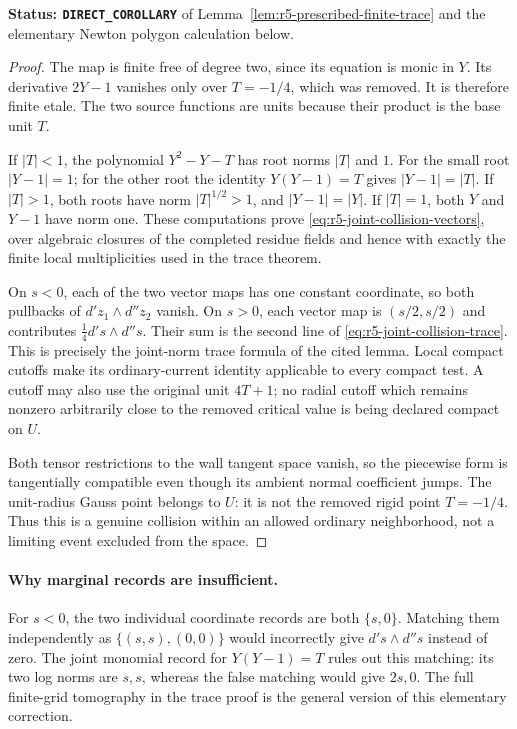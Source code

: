 \documentclass[11pt,a4paper]{article}
\numberwithin{equation}{section}
\theoremstyle{definition}
\theoremstyle{remark}
\begin{document}
\noindent\textbf{Status: \texttt{DIRECT\_COROLLARY}} of
Lemma~\ref{lem:r5-prescribed-finite-trace} and the elementary
Newton polygon calculation below.

\begin{proof}
The map is finite free of degree two, since its equation is monic
in $Y$.  Its derivative $2Y-1$ vanishes only over $T=-1/4$,
which was removed.  It is therefore finite etale.  The two source
functions are units because their product is the base unit $T$.

If $|T|<1$, the polynomial $Y^2-Y-T$ has root norms $|T|$ and
$1$.  For the small root $|Y-1|=1$; for the other root the
identity $Y(Y-1)=T$ gives $|Y-1|=|T|$.  If $|T|>1$, both
roots have norm $|T|^{1/2}>1$, and $|Y-1|=|Y|$.  If $|T|=1$,
both $Y$ and $Y-1$ have norm one.  These computations prove
\eqref{eq:r5-joint-collision-vectors}, over algebraic closures of
the completed residue fields and hence with exactly the finite
local multiplicities used in the trace theorem.

On $s<0$, each of the two vector maps has one constant coordinate,
so both pullbacks of $d'z_1\wedge d''z_2$ vanish.  On $s>0$,
each vector map is $(s/2,s/2)$ and contributes
$\frac14d's\wedge d''s$.  Their sum is the second line of
\eqref{eq:r5-joint-collision-trace}.  This is precisely the
joint-norm trace formula of the cited lemma.  Local compact
cutoffs make its ordinary-current identity applicable to every
compact test.  A cutoff may also use the original unit $4T+1$;
no radial cutoff which remains nonzero arbitrarily close to the
removed critical value is being declared compact on $U$.

Both tensor restrictions to the wall tangent space vanish, so the
piecewise form is tangentially compatible even though its ambient
normal coefficient jumps.  The unit-radius Gauss point belongs to
$U$: it is not the removed rigid point $T=-1/4$.  Thus this is a
genuine collision within an allowed ordinary neighborhood, not a
limiting event excluded from the space.
\end{proof}

\paragraph{Why marginal records are insufficient.}
For $s<0$, the two individual coordinate records are both
$\{s,0\}$.  Matching them independently as
$\{(s,s),(0,0)\}$ would incorrectly give
$d's\wedge d''s$ instead of zero.  The joint monomial record
for $Y(Y-1)=T$ rules out this matching: its two log norms are
$s,s$, whereas the false matching would give $2s,0$.
The full finite-grid tomography in the trace proof is the
general version of this elementary correction.
\end{document}

